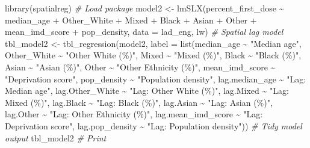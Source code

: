 \documentclass[
]{book}
\newenvironment{Shaded}{\begin{snugshade}}{\end{snugshade}}
\newcommand{\AttributeTok}[1]{\textcolor[rgb]{0.77,0.63,0.00}{#1}}
\newcommand{\CommentTok}[1]{\textcolor[rgb]{0.56,0.35,0.01}{\textit{#1}}}
\newcommand{\FunctionTok}[1]{\textcolor[rgb]{0.00,0.00,0.00}{#1}}
\newcommand{\NormalTok}[1]{#1}
\newcommand{\OtherTok}[1]{\textcolor[rgb]{0.56,0.35,0.01}{#1}}
\newcommand{\SpecialCharTok}[1]{\textcolor[rgb]{0.00,0.00,0.00}{#1}}
\newcommand{\StringTok}[1]{\textcolor[rgb]{0.31,0.60,0.02}{#1}}
\begin{document}
\begin{Shaded}
\begin{Highlighting}[]
\FunctionTok{library}\NormalTok{(spatialreg) }\CommentTok{\# Load package}
\NormalTok{model2 }\OtherTok{\textless{}{-}} \FunctionTok{lmSLX}\NormalTok{(percent\_first\_dose }\SpecialCharTok{\textasciitilde{}}\NormalTok{ median\_age }\SpecialCharTok{+}\NormalTok{ Other\_White }\SpecialCharTok{+}\NormalTok{ Mixed }\SpecialCharTok{+}\NormalTok{ Black }\SpecialCharTok{+}\NormalTok{ Asian }\SpecialCharTok{+}\NormalTok{ Other }\SpecialCharTok{+}\NormalTok{ mean\_imd\_score }\SpecialCharTok{+}\NormalTok{ pop\_density, }\AttributeTok{data =}\NormalTok{ lad\_eng, lw) }\CommentTok{\# Spatial lag model}
\NormalTok{tbl\_model2 }\OtherTok{\textless{}{-}} \FunctionTok{tbl\_regression}\NormalTok{(model2, }\AttributeTok{label =} \FunctionTok{list}\NormalTok{(median\_age }\SpecialCharTok{\textasciitilde{}} \StringTok{"Median age"}\NormalTok{, Other\_White }\SpecialCharTok{\textasciitilde{}} \StringTok{"Other White (\%)"}\NormalTok{, Mixed }\SpecialCharTok{\textasciitilde{}} \StringTok{"Mixed (\%)"}\NormalTok{, Black }\SpecialCharTok{\textasciitilde{}} \StringTok{"Black (\%)"}\NormalTok{, Asian }\SpecialCharTok{\textasciitilde{}} \StringTok{"Asian (\%)"}\NormalTok{, Other }\SpecialCharTok{\textasciitilde{}} \StringTok{"Other Ethnicity (\%)"}\NormalTok{, mean\_imd\_score }\SpecialCharTok{\textasciitilde{}} \StringTok{"Deprivation score"}\NormalTok{, pop\_density }\SpecialCharTok{\textasciitilde{}} \StringTok{"Population density"}\NormalTok{, lag.median\_age }\SpecialCharTok{\textasciitilde{}} \StringTok{"Lag: Median age"}\NormalTok{, lag.Other\_White }\SpecialCharTok{\textasciitilde{}} \StringTok{"Lag: Other White (\%)"}\NormalTok{, lag.Mixed }\SpecialCharTok{\textasciitilde{}} \StringTok{"Lag: Mixed (\%)"}\NormalTok{, lag.Black }\SpecialCharTok{\textasciitilde{}} \StringTok{"Lag: Black (\%)"}\NormalTok{, lag.Asian }\SpecialCharTok{\textasciitilde{}} \StringTok{"Lag: Asian (\%)"}\NormalTok{, lag.Other }\SpecialCharTok{\textasciitilde{}} \StringTok{"Lag: Other Ethnicity (\%)"}\NormalTok{, lag.mean\_imd\_score }\SpecialCharTok{\textasciitilde{}} \StringTok{"Lag: Deprivation score"}\NormalTok{, lag.pop\_density }\SpecialCharTok{\textasciitilde{}} \StringTok{"Lag: Population density"}\NormalTok{)) }\CommentTok{\# Tidy model output}
\NormalTok{tbl\_model2 }\CommentTok{\# Print}
\end{Highlighting}
\end{Shaded}
\end{document}
